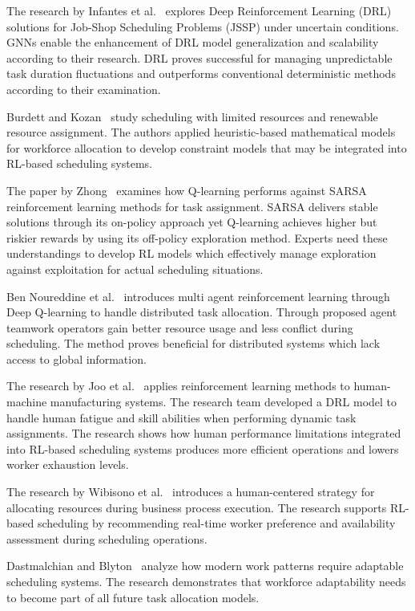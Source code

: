 \documentclass[%
aip,
cp,  %
amsmath,amssymb,
reprint,%
]{revtex4-2}
\begin{document}
	The research by Infantes et al.~\cite{infantes2024} explores Deep
	Reinforcement Learning (DRL) solutions for Job-Shop Scheduling Problems (JSSP)
	under uncertain conditions. GNNs enable the enhancement of DRL model generalization
	and scalability according to their research. DRL proves successful for
	managing unpredictable task duration fluctuations and outperforms conventional
	deterministic methods according to their examination.
	
	Burdett and Kozan~\cite{burdett2004} study scheduling with limited resources
	and renewable resource assignment. The authors applied heuristic-based mathematical
	models for workforce allocation to develop constraint models that may be integrated
	into RL-based scheduling systems.
	
	The paper by Zhong~\cite{zhong2024} examines how Q-learning performs against SARSA
	reinforcement learning methods for task assignment. SARSA delivers stable
	solutions through its on-policy approach yet Q-learning achieves higher but
	riskier rewards by using its off-policy exploration method. Experts need these
	understandings to develop RL models which effectively manage exploration against
	exploitation for actual scheduling situations.
	
	Ben Noureddine et al.~\cite{noureddine2017} introduces multi agent
	reinforcement learning through Deep Q-learning to handle distributed task
	allocation. Through proposed agent teamwork operators gain better resource usage
	and less conflict during scheduling. The method proves beneficial for
	distributed systems which lack access to global information.
	
	The research by Joo et al.~\cite{joo2022} applies reinforcement learning methods
	to human-machine manufacturing systems. The research team developed a DRL
	model to handle human fatigue and skill abilities when performing dynamic task
	assignments. The research shows how human performance limitations integrated into
	RL-based scheduling systems produces more efficient operations and lowers worker
	exhaustion levels.
	
	The research by Wibisono et al.~\cite{wibisono2016} introduces a human-centered
	strategy for allocating resources during business process execution. The research
	supports RL-based scheduling by recommending real-time worker preference and availability
	assessment during scheduling operations.
	
	Dastmalchian and Blyton~\cite{dastmalchian2001} analyze how modern work patterns
	require adaptable scheduling systems. The research demonstrates that workforce
	adaptability needs to become part of all future task allocation models.
	
\end{document}
